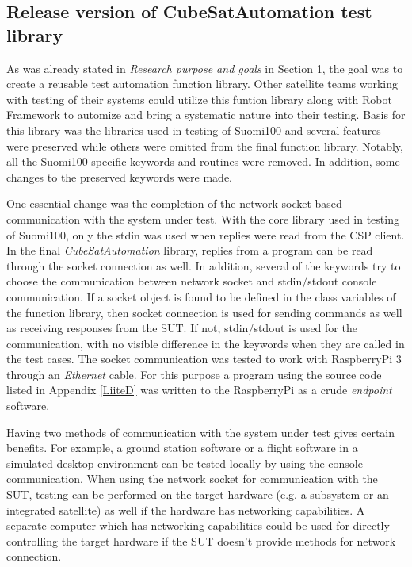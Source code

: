 \documentclass[english,12pt,a4paper,pdftex,elec,utf8]{aaltothesis}
\begin{document}
\subsection{Release version of CubeSatAutomation test library}
As was already stated in \textit{Research purpose and goals} in Section 1, the goal was to create a reusable test automation function library. Other satellite teams working with testing of their systems could utilize this funtion library along with Robot Framework to automize and bring a systematic nature into their testing. 
Basis for this library was the libraries used in testing of Suomi100 and several features were preserved while others were omitted from the final function library. Notably, all the Suomi100 specific keywords and routines were removed. In addition, some changes to the preserved keywords were made.\par 
One essential change was the completion of the network socket based communication with the system under test. With the core library used in testing of Suomi100, only the stdin was used when replies were read from the CSP client. In the final \textit{CubeSatAutomation} library, replies from a program can be read through the socket connection as well. In addition, several of the keywords try to choose the communication between network socket and stdin/stdout console communication. If a socket object is found to be defined in the class variables of the function library, then socket connection is used for sending commands as well as receiving responses from the SUT. If not, stdin/stdout is used for the communication, with no visible difference in the keywords when they are called in the test cases. The socket communication was tested to work with RaspberryPi 3 through an \textit{Ethernet} cable. For this purpose a program using the source code listed in Appendix \ref{LiiteD} was written to the RaspberryPi as a crude \textit{endpoint} software.  \par
Having two methods of communication with the system under test gives certain benefits. For example, a ground station software or a flight software in a simulated desktop environment can be tested locally by using the console communication. When using the network socket for communication with the SUT, testing can be performed on the target hardware (e.g. a subsystem or an integrated satellite) as well if the hardware has networking capabilities. A separate computer which has networking capabilities could be used for directly controlling the target hardware if the SUT doesn't provide methods for network connection. \par 
\end{document}

